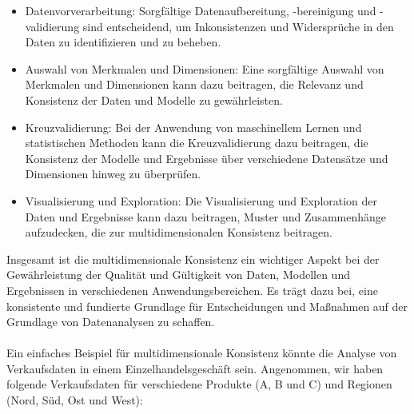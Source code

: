 \documentclass[../vs-script-first-v01.tex]{subfiles}
\begin{document}
\begin{itemize}
\item Datenvorverarbeitung: Sorgfältige Datenaufbereitung, -bereinigung und -validierung sind entscheidend, um Inkonsistenzen und Widersprüche in den Daten zu identifizieren und zu beheben.
\item Auswahl von Merkmalen und Dimensionen: Eine sorgfältige Auswahl von Merkmalen und Dimensionen kann dazu beitragen, die Relevanz und Konsistenz der Daten und Modelle zu gewährleisten.
\item Kreuzvalidierung: Bei der Anwendung von maschinellem Lernen und statistischen Methoden kann die Kreuzvalidierung dazu beitragen, die Konsistenz der Modelle und Ergebnisse über verschiedene Datensätze und Dimensionen hinweg zu überprüfen.
\item Visualisierung und Exploration: Die Visualisierung und Exploration der Daten und Ergebnisse kann dazu beitragen, Muster und Zusammenhänge aufzudecken, die zur multidimensionalen Konsistenz beitragen.
\end{itemize}
Insgesamt ist die multidimensionale Konsistenz ein wichtiger Aspekt bei der Gewährleistung der Qualität und Gültigkeit von Daten, Modellen und Ergebnissen in verschiedenen Anwendungsbereichen. Es trägt dazu bei, eine konsistente und fundierte Grundlage für Entscheidungen und Maßnahmen auf der Grundlage von Datenanalysen zu schaffen.
\\\\
Ein einfaches Beispiel für multidimensionale Konsistenz könnte die Analyse von Verkaufsdaten in einem Einzelhandelsgeschäft sein. Angenommen, wir haben folgende Verkaufsdaten für verschiedene Produkte (A, B und C) und Regionen (Nord, Süd, Ost und West):
\end{document}
